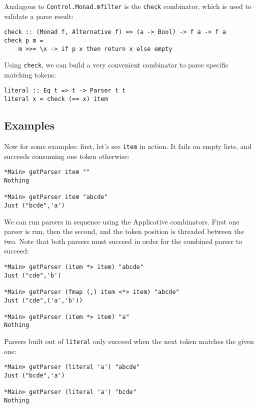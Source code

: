 \documentclass{tmr}
\begin{document}
Analagous to \verb+Control.Monad.mfilter+ is the \verb+check+ combinator, which is used to
validate a parse result:
\begin{verbatim}
check :: (Monad f, Alternative f) => (a -> Bool) -> f a -> f a
check p m =
    m >>= \x -> if p x then return x else empty
\end{verbatim}

Using \verb+check+, we can build a very convenient combinator to parse specific
matching tokens: 
\begin{verbatim}
literal :: Eq t => t -> Parser t t
literal x = check (== x) item
\end{verbatim}

\subsection{Examples}
Now for some examples:  first, let's see \verb+item+ in action.  It fails on empty lists,
and succeeds consuming one token otherwise:
\begin{verbatim}
*Main> getParser item ""
Nothing

*Main> getParser item "abcde"
Just ("bcde",'a')
\end{verbatim}

We can run parsers in sequence using the Applicative combinators.  First one parser
is run, then the second, and the token position is threaded between the two.
Note that both parsers must succeed in order for the combined parser to succeed:
\begin{verbatim}
*Main> getParser (item *> item) "abcde"
Just ("cde",'b')

*Main> getParser (fmap (,) item <*> item) "abcde"
Just ("cde",('a','b'))

*Main> getParser (item *> item) "a"
Nothing
\end{verbatim}

Parsers built out of \verb+literal+ only succeed when the next token matches 
the given one:
\begin{verbatim}
*Main> getParser (literal 'a') "abcde"
Just ("bcde",'a')

*Main> getParser (literal 'a') "bcde"
Nothing
\end{verbatim}
\end{document}
